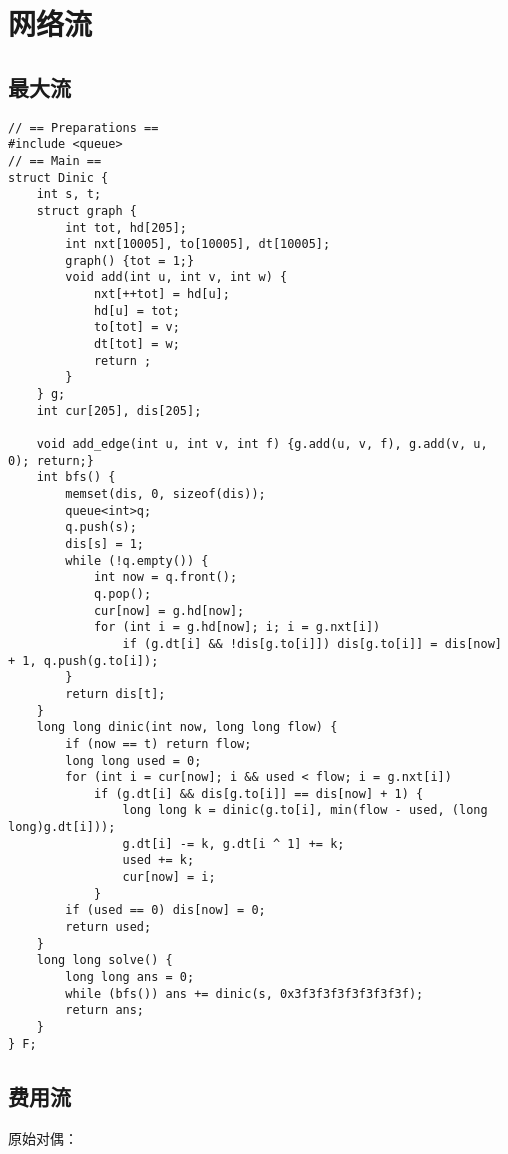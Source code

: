 \section{网络流}

\subsection{最大流}

\begin{verbatim}
// == Preparations ==
#include <queue>
// == Main ==
struct Dinic {
    int s, t;
    struct graph {
        int tot, hd[205];
        int nxt[10005], to[10005], dt[10005];
        graph() {tot = 1;}
        void add(int u, int v, int w) {
            nxt[++tot] = hd[u];
            hd[u] = tot;
            to[tot] = v;
            dt[tot] = w;
            return ;
        }
    } g;
    int cur[205], dis[205];

    void add_edge(int u, int v, int f) {g.add(u, v, f), g.add(v, u, 0); return;}
    int bfs() {
        memset(dis, 0, sizeof(dis));
        queue<int>q;
        q.push(s);
        dis[s] = 1;
        while (!q.empty()) {
            int now = q.front();
            q.pop();
            cur[now] = g.hd[now];
            for (int i = g.hd[now]; i; i = g.nxt[i])
                if (g.dt[i] && !dis[g.to[i]]) dis[g.to[i]] = dis[now] + 1, q.push(g.to[i]);
        }
        return dis[t];
    }
    long long dinic(int now, long long flow) {
        if (now == t) return flow;
        long long used = 0;
        for (int i = cur[now]; i && used < flow; i = g.nxt[i])
            if (g.dt[i] && dis[g.to[i]] == dis[now] + 1) {
                long long k = dinic(g.to[i], min(flow - used, (long long)g.dt[i]));
                g.dt[i] -= k, g.dt[i ^ 1] += k;
                used += k;
                cur[now] = i;
            }
        if (used == 0) dis[now] = 0;
        return used;
    }
    long long solve() {
        long long ans = 0;
        while (bfs()) ans += dinic(s, 0x3f3f3f3f3f3f3f3f);
        return ans;
    }
} F;
\end{verbatim}

\subsection{费用流}

原始对偶：

